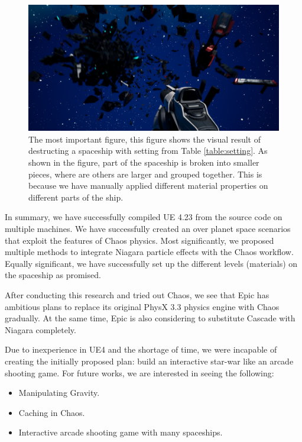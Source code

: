 \documentclass[sigconf]{acmart}
\begin{document}
\begin{figure}
    \centering
    \includegraphics[width=.8\linewidth]{aaafiles/newresult2.png}
    \caption{The most important figure, this figure shows the visual result of destructing a spaceship with setting from Table \ref{table:setting}. As shown in the figure, part of the spaceship is broken into smaller pieces, where are others are larger and grouped together. This is because we have manually applied different material properties on different parts of the ship. }
    \label{fig:new_result2}
\end{figure}

In summary, we have successfully compiled UE 4.23 from the source code on multiple machines. We have successfully created an over planet space scenarios that exploit the features of Chaos physics. Most significantly, we proposed multiple methods to integrate Niagara particle effects with the Chaos workflow. Equally significant, we have successfully set up the different levels (materials) on the spaceship as promised.

After conducting this research and tried out Chaos, we see that Epic has ambitious plans to replace its original PhysX 3.3 physics engine with Chaos gradually. At the same time, Epic is also considering to substitute Cascade with Niagara completely. 

Due to inexperience in UE4 and the shortage of time, we were incapable of creating the initially proposed plan: build an interactive star-war like an arcade shooting game. For future works, we are interested in seeing the following: 

\begin{itemize}
    \item Manipulating Gravity. 
    \item Caching in Chaos.
    \item Interactive arcade shooting game with many spaceships. 
\end{itemize}
\end{document}
